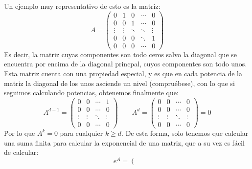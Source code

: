 \begin{ejemplo}
\begin{enumerate}
            Un ejemplo muy representativo de esto es la matriz:
            \begin{equation*}
                A = \left(\begin{array}{ccccc}
                        0 & 1 & 0 & \cdots & 0 \\
                        0 & 0 & 1 & \cdots & 0 \\
                        \vdots & \vdots & \ddots & \ddots & \vdots \\
                        0 & 0 & 0 & \ddots & 1 \\
                        0 & 0 & 0 & \cdots & 0
                \end{array}\right)
            \end{equation*}
            Es decir, la matriz cuyas componentes son todo ceros salvo la diagonal que se encuentra por encima de la diagonal princpal, cuyos componentes son todo unos. Esta matriz cuenta con una propiedad especial, y es que en cada potencia de la matriz la diagonal de los unos asciende un nivel (compruébese), con lo que si seguimos calculando potencias, obtenemos finalmente que:
            \begin{equation*}
                A^{d-1} = \left(\begin{array}{cccc}
                        0 & 0 & \cdots & 1 \\
                        0 & 0 & \cdots & 0 \\
                        \vdots & \vdots & \ddots & \vdots \\
                        0 & 0  & \cdots & 0
                \end{array}\right) \qquad A^d = \left(\begin{array}{cccc}
                     0 & 0 & \cdots & 0\\
                     0& 0 & \cdots & 0\\
                    \vdots & \vdots & \ddots & \vdots \\
                    0 & 0 & \cdots &0 
                \end{array}\right) = 0
            \end{equation*}
            Por lo que $A^k = 0$ para cualquier $k\geq d$. De esta forma, solo tenemos que calcular una suma finita para calcular la exponencial de una matriz, que a su vez es fácil de calcular:
            \begin{equation*}
                e^A = \left(\begin{array}{ccccc}

\end{array}
\end{equation*}
\end{enumerate}
\end{ejemplo}
